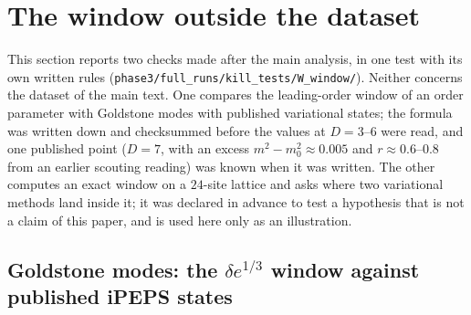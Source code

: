 \documentclass[aps,prx,onecolumn,10pt,nofootinbib,longbibliography,floatfix]{revtex4-2}
\theoremstyle{remark}
\newcommand{\de}{\delta e}
\begin{document}
\section{The window outside the dataset}
\label{sm:window}

This section reports two checks made after the main analysis, in one test with its own written rules
(\texttt{phase3/\allowbreak full\_runs/\allowbreak kill\_tests/\allowbreak W\_window/}). Neither concerns the dataset of the main text. One compares
the leading-order window of an order parameter with Goldstone modes with published variational states; the formula was
written down and checksummed before the values at $D=3$--$6$ were read, and one published point ($D=7$, with an excess %
$m^2-m_0^2\approx 0.005$ and $r\approx 0.6$--$0.8$ from an earlier scouting reading) was known when it was written. The %
other computes an exact window on a
$24$-site lattice and asks where two variational methods land inside it; it was declared in advance to test a %
hypothesis that is not a claim of this paper, and is used here only as an illustration.

\subsection{Goldstone modes: the $\de^{1/3}$ window against published iPEPS states}
\end{document}
